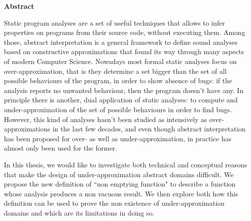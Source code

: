 \thispagestyle{plain}
\begin{center}
	\Large
	\textbf{\thesistitle}
	
	
	\vspace{1.2cm}
	\large
	\peopleheader	
	\textbf{\authornamefl} \hfill \textbf{\supervisors}
	
	\vspace{2.0cm}
	\textbf{Abstract}
\end{center}
Static program analyses are a set of useful techniques that allows to infer properties on programs from their source code, without executing them. Among those, abstract interpretation is a general framework to define sound analyses based on constructive approximations that found its way through many aspects of modern Computer Science.
Nowadays most formal static analyses focus on over-approximation, that is they determine a set bigger than the set of all possible behaviours of the program, in order to show absence of bugs: if the analysis reports no unwanted behaviour, then the program doesn't have any.
In principle there is another, dual application of static analyses: to compute and under-approximation of the set of possible behaviours in order to find bugs. However, this kind of analyses hasn't been studied as intensively as over-approximations in the last few decades, and even though abstract interpretation has been proposed for over- as well as under-approximation, in practice has almost only been used for the former.

In this thesis, we would like to investigate both technical and conceptual reasons that make the design of under-approximation abstract domains difficult. We propose the new definition of ``non emptying function" to describe a function whose analysis produces a non vacuous result. We then explore both how this definition can be used to prove the non existence of under-approximation domains and which are its limitations in doing so.
